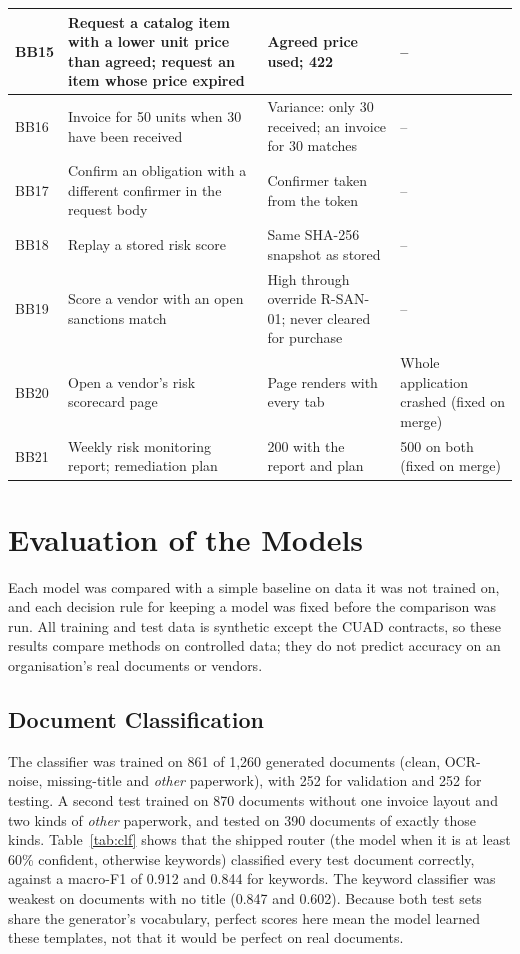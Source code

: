 \begin{table}[H]
\begin{tabularx}{\textwidth}{|C{0.06\textwidth}|L{0.30\textwidth}|Y|L{0.17\textwidth}|}
BB15 & Request a catalog item with a lower unit price than agreed; request an item whose price expired & Agreed price used; 422  & -- \\ \hline
BB16 & Invoice for 50 units when 30 have been received & Variance: only 30 received; an invoice for 30 matches & -- \\ \hline
BB17 & Confirm an obligation with a different confirmer in the request body & Confirmer taken from the token & -- \\ \hline
BB18 & Replay a stored risk score & Same SHA-256 snapshot as stored & -- \\ \hline
BB19 & Score a vendor with an open sanctions match & High through override R-SAN-01; never cleared for purchase & -- \\ \hline
BB20 & Open a vendor's risk scorecard page & Page renders with every tab & Whole application crashed (fixed on merge) \\ \hline
BB21 & Weekly risk monitoring report; remediation plan & 200 with the report and plan & 500 on both (fixed on merge) \\ \hline
\end{tabularx}
\end{table}

\section{Evaluation of the Models}\label{sec:eval}
Each model was compared with a simple baseline on data it was not trained on, and each decision rule for keeping a model was fixed before the comparison was run. All training and test data is synthetic except the CUAD contracts, so these results compare methods on controlled data; they do not predict accuracy on an organisation's real documents or vendors.

\subsection{Document Classification}
The classifier was trained on 861 of 1,260 generated documents (clean, OCR-noise, missing-title and \emph{other} paperwork), with 252 for validation and 252 for testing. A second test trained on 870 documents without one invoice layout and two kinds of \emph{other} paperwork, and tested on 390 documents of exactly those kinds. Table~\ref{tab:clf} shows that the shipped router (the model when it is at least 60\% confident, otherwise keywords) classified every test document correctly, against a macro-F1 of 0.912 and 0.844 for keywords. The keyword classifier was weakest on documents with no title (0.847 and 0.602). Because both test sets share the generator's vocabulary, perfect scores here mean the model learned these templates, not that it would be perfect on real documents.

